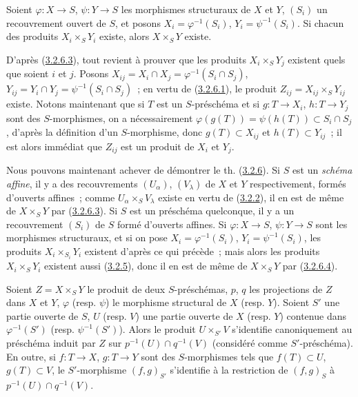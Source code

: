 \begin{lemma}[3.2.6.4]
\label{I.3.2.6.4-fr}
Soient $\varphi:X\to S$, $\psi:Y\to S$ les morphismes structuraux de $X$
et $Y$, $(S_i)$ un recouvrement ouvert de $S$, et posons
$X_i=\varphi^{-1}(S_i)$, $Y_i=\psi^{-1}(S_i)$. Si chacun des produits
$X_i\times_S Y_i$ existe, alors $X\times_S Y$ existe.
\end{lemma}

D'après (\hyperref[I.3.2.6.3-fr]{3.2.6.3}), tout revient à prouver que les
produits $X_i\times_S Y_j$ existent quels que soient $i$ et $j$. Posons
$X_{ij}=X_i\cap X_j=\varphi^{-1}(S_i\cap S_j)$,
$Y_{ij}=Y_i\cap Y_j=\psi^{-1}(S_i\cap S_j)$~; en vertu de
(\hyperref[I.3.2.6.1-fr]{3.2.6.1}), le produit
$Z_{ij}=X_{ij}\times_S Y_{ij}$ existe. Notons maintenant que si $T$ est un
$S$-préschéma et si $g:T\to X_i$, $h:T\to Y_j$ sont des $S$-morphismes, on
a nécessairement
$\varphi(g(T))=\psi(h(T))\subset S_i\cap S_j$, d'après la définition d'un
$S$-morphisme, donc $g(T)\subset X_{ij}$ et $h(T)\subset Y_{ij}$~; il est
alors immédiat que $Z_{ij}$ est un produit de $X_i$ et $Y_j$.

\begin{env}[3.2.6.5]
\label{I.3.2.6.5-fr}
Nous pouvons maintenant achever de démontrer le th.
(\hyperref[I.3.2.6-fr]{3.2.6}). Si $S$ est un \emph{schéma affine}, il y a
des recouvrements $(U_\alpha)$, $(V_\lambda)$ de $X$ et $Y$ respectivement,
formés d'ouverts affines~; comme $U_\alpha\times_S V_\lambda$ existe en
vertu de (\hyperref[I.3.2.2-fr]{3.2.2}), il en est de même de
$X\times_S Y$ par (\hyperref[I.3.2.6.3-fr]{3.2.6.3}). Si $S$ est un
préschéma quelconque, il y a un recouvrement $(S_i)$ de $S$ formé d'ouverts
affines. Si $\varphi:X\to S$, $\psi:Y\to S$ sont les morphismes
structuraux, et si on pose $X_i=\varphi^{-1}(S_i)$,
$Y_i=\psi^{-1}(S_i)$, les produits $X_i\times_{S_i}Y_i$ existent d'après ce
qui
précède~; mais alors les produits $X_i\times_S Y_i$ existent aussi
(\hyperref[I.3.2.5-fr]{3.2.5}), donc il en est de même de $X\times_S Y$ par
(\hyperref[I.3.2.6.4-fr]{3.2.6.4}).
\end{env}

\begin{corollary}[3.2.7]
\label{I.3.2.7-fr}
Soient $Z=X\times_S Y$ le produit de deux $S$-préschémas, $p$, $q$ les
projections de $Z$ dans $X$ et $Y$, $\varphi$ (resp. $\psi$) le morphisme
structural de $X$ (resp. $Y$). Soient $S'$ une partie ouverte de $S$, $U$
(resp. $V$) une partie ouverte de $X$ (resp. $Y$) contenue dans
$\varphi^{-1}(S')$ (resp. $\psi^{-1}(S')$). Alors le produit
$U\times_{S'}V$ s'identifie canoniquement au préschéma induit par $Z$ sur
$p^{-1}(U)\cap q^{-1}(V)$ (considéré comme $S'$-préschéma). En outre, si
$f:T\to X$, $g:T\to Y$ sont des $S$-morphismes tels que $f(T)\subset U$,
$g(T)\subset V$, le $S'$-morphisme $(f,g)_{S'}$ s'identifie à la restriction
de $(f,g)_S$ à $p^{-1}(U)\cap q^{-1}(V)$.
\end{corollary}

